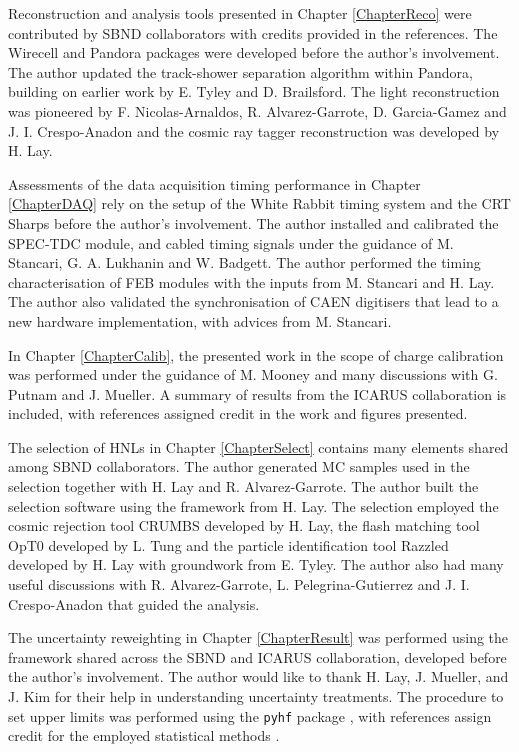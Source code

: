 \begin{declaration}
Reconstruction and analysis tools presented in Chapter \ref{ChapterReco} were contributed by SBND collaborators with credits provided in the references.
The Wirecell \cite{wirecell} and Pandora \cite{pandora} packages were developed before the author's involvement.
The author updated the track-shower separation algorithm within Pandora, building on earlier work by E. Tyley and D. Brailsford.
The light reconstruction was pioneered by F. Nicolas-Arnaldos, R. Alvarez-Garrote, D. Garcia-Gamez and J. I. Crespo-Anadon and the cosmic ray tagger reconstruction was developed by H. Lay.  

Assessments of the data acquisition timing performance in Chapter \ref{ChapterDAQ} rely on the setup of the White Rabbit timing system and the CRT Sharps before the author's involvement.
The author installed and calibrated the SPEC-TDC module, and cabled timing signals under the guidance of M. Stancari, G. A. Lukhanin and W. Badgett.
The author performed the timing characterisation of FEB modules with the inputs from M. Stancari and H. Lay.
The author also validated the synchronisation of CAEN digitisers that lead to a new hardware implementation, with advices from M. Stancari.

In Chapter \ref{ChapterCalib}, the presented work in the scope of charge calibration was performed under the guidance of M. Mooney and many discussions with G. Putnam and J. Mueller.
A summary of results from the ICARUS collaboration is included, with references assigned credit in the work and figures presented.

The selection of HNLs in Chapter \ref{ChapterSelect} contains many elements shared among SBND collaborators.
The author generated MC samples used in the selection together with H. Lay and R. Alvarez-Garrote.
The author built the selection software using the framework from H. Lay. 
The selection employed the cosmic rejection tool CRUMBS developed by H. Lay, the flash matching tool OpT0 developed by L. Tung and the particle identification tool Razzled developed by H. Lay with groundwork from E. Tyley.
The author also had many useful discussions with R. Alvarez-Garrote, L. Pelegrina-Gutierrez and J. I. Crespo-Anadon that guided the analysis.

The uncertainty reweighting in Chapter \ref{ChapterResult} was performed using the framework shared across the SBND and ICARUS collaboration, developed before the author's involvement.
The author would like to thank H. Lay, J. Mueller, and J. Kim for their help in understanding uncertainty treatments.
The procedure to set upper limits was performed using the \texttt{pyhf} package \cite{pyhf_joss}, with references assign credit for the employed statistical methods \cite{asymptotic_test, CLs_Junk, CLs_Read}.


\end{declaration}
